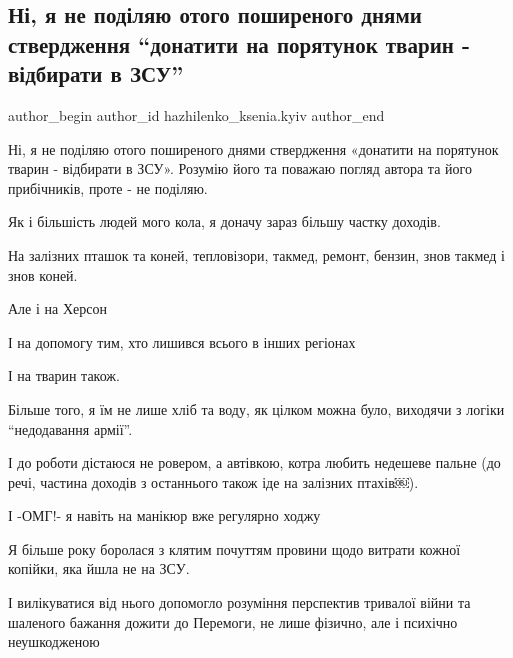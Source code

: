  
 
 
 
 

\subsection{Ні, я не поділяю отого поширеного днями ствердження \enquote{донатити на порятунок тварин - відбирати в ЗСУ}}
\label{sec:14_06_2023.fb.hazhilenko_ksenia.kyiv.1.donatyty_na_porjatunok_tvaryn_vidbyraty_v_zsu}

\ifcmt
 author_begin
   author_id hazhilenko_ksenia.kyiv
 author_end
\fi

Ні, я не поділяю отого поширеного днями ствердження «донатити на порятунок
тварин - відбирати в ЗСУ». Розумію його та поважаю погляд автора та його
прибічників, проте - не поділяю. 

Як і більшість людей мого кола, я доначу зараз більшу частку доходів. 

На залізних пташок та коней, тепловізори, такмед, ремонт, бензин, знов такмед і
знов коней.

Але і на Херсон 

І на допомогу тим, хто лишився всього в інших регіонах 

І на тварин також.

Більше того, я їм не лише хліб та воду, як цілком можна було, виходячи з логіки
\enquote{недодавання армії}.

І до роботи дістаюся не ровером, а автівкою, котра любить недешеве пальне (до
речі, частина доходів з останнього також іде на залізних птахів￼). 

І -ОМГ!- я навіть на манікюр вже регулярно ходжу 

Я більше року боролася з клятим почуттям провини щодо витрати кожної копійки,
яка йшла не на ЗСУ. 

І вилікуватися від нього допомогло розуміння перспектив тривалої війни та
шаленого бажання дожити до Перемоги, не лише фізично, але і психічно
неушкодженою

